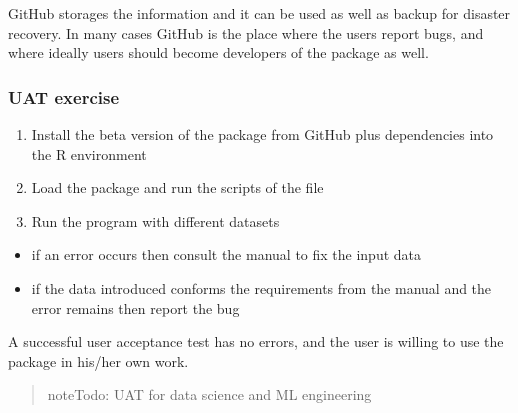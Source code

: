 \documentclass[a4paper,12pt,english]{sphinxhowto}
\begin{document}
GitHub storages the information and it can be used as well as backup for
disaster recovery. In many cases GitHub is the place where the users
report bugs, and where ideally users should become developers of the
package as well.



\subsubsection{UAT exercise}
\label{\detokenize{UAT:uat-exercise}}\begin{enumerate}
%
\item {} 
Install the beta version of the package from GitHub plus dependencies into the R environment

\item {} 
Load the package and run the scripts of the  file

\item {} 
Run the program with different datasets

\end{enumerate}
\begin{itemize}
\item {} 
if an error occurs then consult the manual to fix the input data

\item {} 
if the data introduced conforms the requirements from the manual and the error remains then report the bug

\end{itemize}

A successful user acceptance test has no errors, and the user is willing
to use the package in his/her own work.


\begin{quote}

\begin{sphinxadmonition}{note}{\label{\detokenize{UAT:id1}}Todo:}
UAT for data science and ML engineering
\end{sphinxadmonition}
\end{quote}
\end{document}
